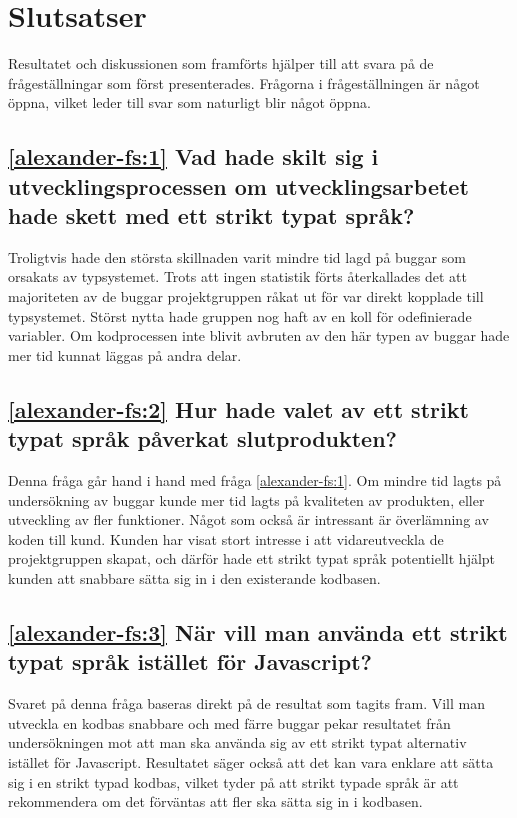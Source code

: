 \section{Slutsatser}
\label{sec:alexander-conclusion}

Resultatet och diskussionen som framförts hjälper till att svara på de frågeställningar som först presenterades.  Frågorna i frågeställningen är något öppna, vilket leder till svar som naturligt blir något öppna.

\subsection*{\ref{alexander-fs:1} Vad hade skilt sig i utvecklingsprocessen om utvecklingsarbetet hade skett med ett strikt typat språk?}
Troligtvis hade den största skillnaden varit mindre tid lagd på buggar som orsakats av typsystemet. Trots att ingen statistik förts återkallades det att majoriteten av de buggar projektgruppen råkat ut för var direkt kopplade till typsystemet. Störst nytta hade gruppen nog haft av en koll för odefinierade variabler. Om kodprocessen inte blivit avbruten av den här typen av buggar hade mer tid kunnat läggas på andra delar.

\subsection*{\ref{alexander-fs:2} Hur hade valet av ett strikt typat språk påverkat slutprodukten?}
Denna fråga går hand i hand med fråga \ref{alexander-fs:1}. Om mindre tid lagts på undersökning av buggar kunde mer tid lagts på kvaliteten av produkten, eller utveckling av fler funktioner. Något som också är intressant är överlämning av koden till kund. Kunden har visat stort intresse i att vidareutveckla de projektgruppen skapat, och därför hade ett strikt typat språk potentiellt hjälpt kunden att snabbare sätta sig in i den existerande kodbasen.

\subsection*{\ref{alexander-fs:3} När vill man använda ett strikt typat språk istället för Javascript?}
Svaret på denna fråga baseras direkt på de resultat som tagits fram. Vill man utveckla en kodbas snabbare och med färre buggar pekar resultatet från undersökningen mot att man ska använda sig av ett strikt typat alternativ istället för Javascript. Resultatet säger också att det kan vara enklare att sätta sig i en strikt typad kodbas, vilket tyder på att strikt typade språk är att rekommendera om det förväntas att fler ska sätta sig in i kodbasen.  
